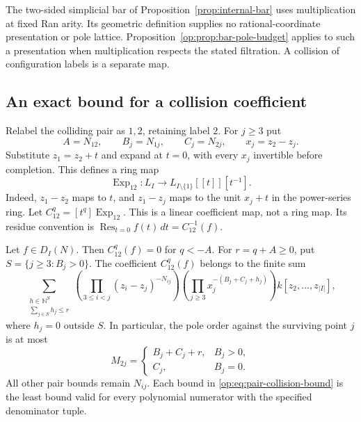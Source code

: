 The two-sided simplicial bar of
Proposition~\ref{prop:internal-bar} uses multiplication at fixed Ran
arity.  Its geometric definition supplies no rational-coordinate
presentation or pole lattice.  Proposition~\ref{op:prop:bar-pole-budget}
applies to such a presentation when multiplication respects the stated
filtration.  A collision of configuration labels is a separate map.

\subsection{An exact bound for a collision coefficient}

Relabel the colliding pair as \(1,2\), retaining label \(2\).
For \(j\ge3\) put
\[
 A=N_{12},\qquad B_j=N_{1j},\qquad C_j=N_{2j},\qquad
 x_j=z_2-z_j.
\]
Substitute \(z_1=z_2+t\) and expand at \(t=0\), with every
\(x_j\) invertible before completion.  This defines a ring map
\[
 \operatorname{Exp}_{12}:L_I\longrightarrow
 L_{I\setminus\{1\}}[[t]][t^{-1}].
\]
Indeed, \(z_1-z_2\) maps to \(t\), and
\(z_1-z_j\) maps to the unit \(x_j+t\) in the power-series ring.
Let \(C_{12}^q=[t^q]\operatorname{Exp}_{12}\).  This is a linear
coefficient map, not a ring map.  Its residue convention is
\(\operatorname{Res}_{t=0}f(t)\,dt=C_{12}^{-1}(f)\).

\begin{theorem}
\label{op:thm:collision-poles}
Let \(f\in D_I(N)\).  Then \(C_{12}^q(f)=0\) for \(q<-A\).
For \(r=q+A\ge0\), put \(S=\{j\ge3:B_j>0\}\).  The
coefficient \(C_{12}^q(f)\) belongs to the finite sum
\begin{equation}\label{op:eq:collision-budget}
 \sum_{\substack{h\in\mathbb N^S\\\sum_{j\in S}h_j\le r}}
 \left(\prod_{3\le i<j}(z_i-z_j)^{-N_{ij}}\right)
 \left(\prod_{j\ge3}x_j^{-(B_j+C_j+h_j)}\right)
 k[z_2,\ldots,z_{|I|}],
\end{equation}
where \(h_j=0\) outside \(S\).  In particular, the pole order
against the surviving point \(j\) is at most
\begin{equation}\label{op:eq:pair-collision-bound}
 M_{2j}=
 \begin{cases}
 B_j+C_j+r,&B_j>0,\\
 C_j,&B_j=0.
 \end{cases}
\end{equation}
All other pair bounds remain \(N_{ij}\).  Each bound in
\eqref{op:eq:pair-collision-bound} is the least bound valid for every
polynomial numerator with the specified denominator tuple.
\end{theorem}

